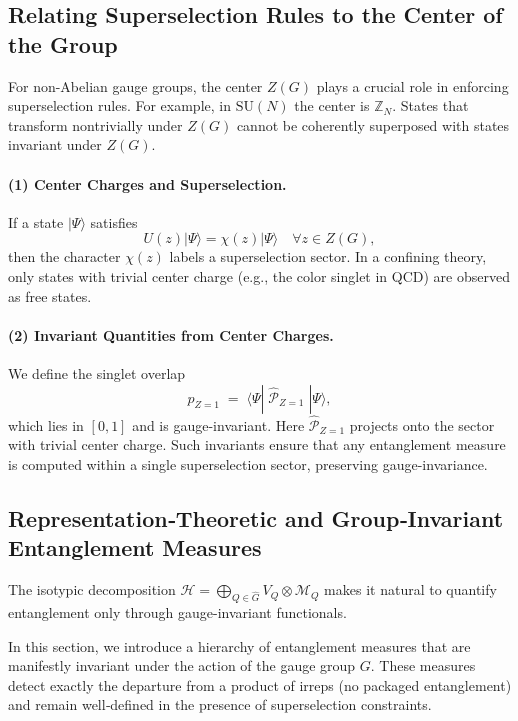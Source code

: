 \documentclass[12pt,a4paper]{article}
\begin{document}
\subsection{Relating Superselection Rules to the Center of the Group}

For non-Abelian gauge groups, the center $Z(G)$ plays a crucial role in enforcing superselection rules.
For example, in $\mathrm{SU}(N)$ the center is $\mathbb{Z}_N$.
States that transform nontrivially under $Z(G)$ cannot be coherently superposed with states invariant under $Z(G)$.

\paragraph{(1) Center Charges and Superselection.}  
If a state $|\Psi\rangle$ satisfies
\[
U(z)|\Psi\rangle = \chi(z)|\Psi\rangle \quad \forall z\in Z(G),
\]
then the character $\chi(z)$ labels a superselection sector. In a confining theory, only states with trivial center charge (e.g., the color singlet in QCD) are observed as free states.

\paragraph{(2) Invariant Quantities from Center Charges.}  
We define the singlet overlap
\[
p_{Z=1} \;=\;
\langle\Psi|\;\hat{\mathcal P}_{Z=1}\;|\Psi\rangle,
\]
which lies in $[0,1]$ and is gauge-invariant.
Here $\hat{\mathcal{P}}_{Z=1}$ projects onto the sector with trivial center charge.
Such invariants ensure that any entanglement measure is computed within a single superselection sector, preserving gauge-invariance.




\subsection{Representation‐Theoretic and Group‐Invariant Entanglement Measures}


The isotypic decomposition 
$
\mathcal H = \bigoplus_{Q\in\widehat G}V_Q\otimes\mathcal M_Q
$
makes it natural to quantify entanglement only through gauge-invariant functionals.


In this section, we introduce a hierarchy of entanglement measures that are manifestly invariant under the action of the gauge group $G$.
These measures detect exactly the departure from a product of irreps (no packaged entanglement) and remain well‐defined in the presence of superselection constraints.
\end{document}
